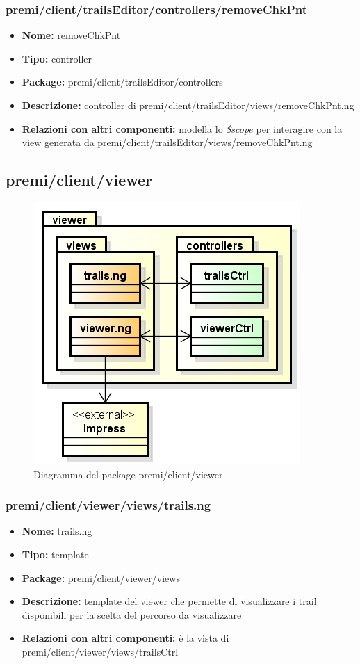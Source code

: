 \subsubsection{premi/client/trailsEditor/controllers/removeChkPnt}
\begin{itemize}
  \item[] \textbf{Nome:} removeChkPnt
  \item[] \textbf{Tipo:} controller
  \item[] \textbf{Package:} premi/client/trailsEditor/controllers
  \item[] \textbf{Descrizione:} controller di premi/client/trailsEditor/views/removeChkPnt.ng
  \item[] \textbf{Relazioni con altri componenti:} modella lo \textit{\$scope} per interagire con la view generata da premi/client/trailsEditor/views/removeChkPnt.ng
\end{itemize}

\subsection{premi/client/viewer}
\begin{figure}[!h]
\begin{center}
\includegraphics[scale=0.45]{img/diapkg/viewer.png}
\caption{Diagramma del package premi/client/viewer}
\end{center}
\end{figure}
\subsubsection{premi/client/viewer/views/trails.ng}
\begin{itemize}
  \item[] \textbf{Nome:} trails.ng
  \item[] \textbf{Tipo:} template
  \item[] \textbf{Package:} premi/client/viewer/views
  \item[] \textbf{Descrizione:} template del viewer che permette di visualizzare i trail disponibili per la scelta del percorso da visualizzare
  \item[] \textbf{Relazioni con altri componenti:} è la vista di premi/client/viewer/views/trailsCtrl
\end{itemize}
